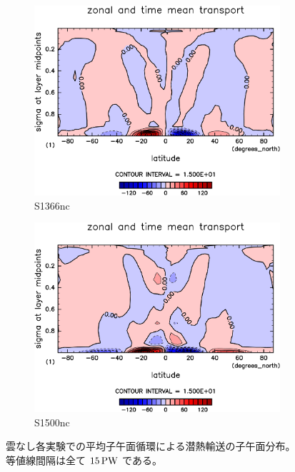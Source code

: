 \documentclass[body]{subfiles}
\begin{document}
\begin{figure}[t]
	\centering
	\begin{subfigure}{.4\textwidth}
		\centering
		\includegraphics[width=\columnwidth]{S1366-nc/MeriHeatTransTest@latentEn_M,time=3650:4015-crop-rotate.pdf}
		\caption{S1366nc}\label{潜熱平均子午面循環S1366nc}
	\end{subfigure}
	\begin{subfigure}{.4\textwidth}
		\centering
		\includegraphics[width=\columnwidth]{S1500-nc/MeriHeatTransTest@latentEn_M,time=3650:4015-crop-rotate.pdf}
		\caption{S1500nc}\label{潜熱平均子午面循環S1500nc}
	\end{subfigure}
	\caption[雲なし各実験での平均子午面循環による潜熱輸送の子午面分布]{
		雲なし各実験での平均子午面循環による潜熱輸送の子午面分布。
		等値線間隔は全て \(15\hmu{PW}\) である。
	}\label{潜熱平均子午面循環nc}
\end{figure}
\end{document}
